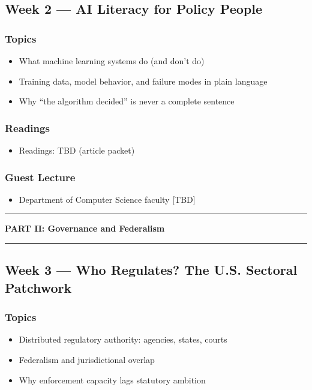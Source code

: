 \documentclass[12pt]{article}
\begin{document}
\subsection*{Week 2 --- AI Literacy for Policy People}
    \subsubsection*{Topics}
        \begin{itemize}
            \item What machine learning systems do (and don't do)
            \item Training data, model behavior, and failure modes in plain language
            \item Why ``the algorithm decided'' is never a complete sentence
        \end{itemize}
    \subsubsection*{Readings}
        \begin{itemize}
            \item Readings: TBD (article packet)
        \end{itemize}
    \subsubsection*{Guest Lecture}
        \begin{itemize}
            \item Department of Computer Science faculty [TBD]
        \end{itemize}

\bigskip
\noindent\rule{\textwidth}{0.6pt}
\begin{center}\textbf{PART II: Governance and Federalism}\end{center}
\noindent\rule{\textwidth}{0.6pt}

\subsection*{Week 3 --- Who Regulates? The U.S. Sectoral Patchwork}
    \subsubsection*{Topics}
        \begin{itemize}
            \item Distributed regulatory authority: agencies, states, courts
            \item Federalism and jurisdictional overlap
            \item Why enforcement capacity lags statutory ambition
        \end{itemize}
\end{document}
